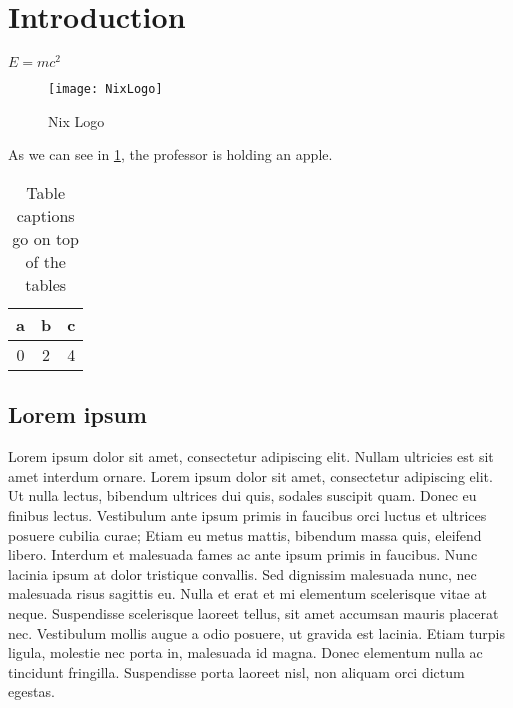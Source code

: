 
\section{Introduction}%
\label{sec:introduction}

\(E = mc^2\) \cite{einstein}

\begin{figure}[H]
    \centering
    \texttt{[image: NixLogo]}
    \caption{Nix Logo}%
    \label{fig:profocto}
\end{figure}

As we can see in \cref{fig:profocto}, the professor is holding an apple.

\begin{table}[H]
    \begin{center}
    \caption{Table captions go on top of the tables}%
    \label{tab:example}
    \begin{tabular}{ccc}
        \toprule
        a & b & c \\
        \midrule
        0 & 2 & 4 \\
        \bottomrule
    \end{tabular}
    \end{center}
\end{table}

\subsection{Lorem ipsum}%
\label{sub:lorem_ipsum}

Lorem ipsum dolor sit amet, consectetur adipiscing elit. Nullam ultricies est sit amet interdum ornare. Lorem ipsum dolor sit amet, consectetur adipiscing elit. Ut nulla lectus, bibendum ultrices dui quis, sodales suscipit quam. Donec eu finibus lectus. Vestibulum ante ipsum primis in faucibus orci luctus et ultrices posuere cubilia curae; Etiam eu metus mattis, bibendum massa quis, eleifend libero. Interdum et malesuada fames ac ante ipsum primis in faucibus. Nunc lacinia ipsum at dolor tristique convallis. Sed dignissim malesuada nunc, nec malesuada risus sagittis eu. Nulla et erat et mi elementum scelerisque vitae at neque. Suspendisse scelerisque laoreet tellus, sit amet accumsan mauris placerat nec. Vestibulum mollis augue a odio posuere, ut gravida est lacinia. Etiam turpis ligula, molestie nec porta in, malesuada id magna. Donec elementum nulla ac tincidunt fringilla. Suspendisse porta laoreet nisl, non aliquam orci dictum egestas.

